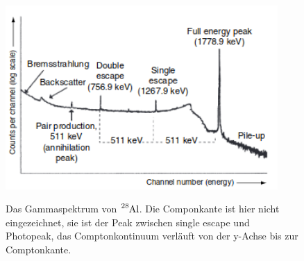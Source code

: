 \begin{figure}
  \centering
  \includegraphics[height=7cm]{Spektrum.png}
  \caption{Das Gammaspektrum von $\ce{^{28}Al}$. Die Componkante ist hier nicht eingezeichnet, sie ist der Peak zwischen single escape und Photopeak,
  das Comptonkontinuum verläuft von der y-Achse bis zur Comptonkante.}\cite{Gilmore2}
  \label{fig:Spektrum}
\end{figure}

